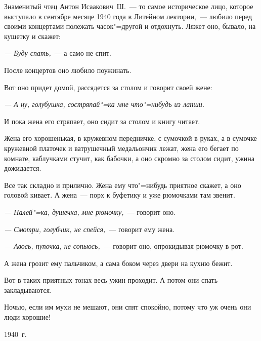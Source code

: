 Знаменитый чтец Антон Исаакович~Ш.~--- то самое историческое лицо, которое выступало в сентябре месяце 1940 года в Литейном лектории,~--- любило перед своими концертами полежать часок"=другой и отдохнуть. Ляжет оно, бывало, на кушетку и скажет:

\textit{--- Буду спать,}~--- а само не спит.

После концертов оно любило поужинать.

Вот оно придет домой, рассядется за столом и говорит своей жене:

\textit{--- А ну, голубушка, состряпай"=ка мне что"=нибудь из лапши.}

И пока жена его стряпает, оно сидит за столом и книгу читает.

Жена его хорошенькая, в кружевном передничке, с сумочкой в руках, а в сумочке кружевной платочек и ватрушечный медальончик лежат, жена его бегает по комнате, каблучками стучит, как бабочки, а оно скромно за столом сидит, ужина дожидается.

Все так складно и прилично. Жена ему что"=нибудь приятное скажет, а оно головой кивает. А жена~--- порх к буфетику и уже рюмочками там звенит.

\textit{--- Налей"=ка, душечка, мне рюмочку,}~--- говорит оно.

\textit{--- Смотри, голубчик, не спейся,}~--- говорит ему жена.

\textit{--- Авось, пупочка, не сопьюсь,}~--- говорит оно, опрокидывая рюмочку в рот.

А жена грозит ему пальчиком, а сама боком через двери на кухню бежит.

Вот в таких приятных тонах весь ужин проходит. А потом они спать закладываются.

Ночью, если им мухи не мешают, они спят спокойно, потому что уж очень они люди хорошие!

\begin{flushright}
1940~г.
\end{flushright}

